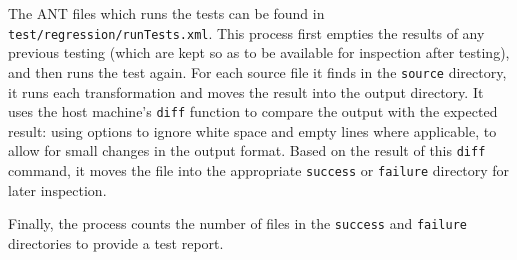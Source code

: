 The ANT files which runs the tests can be found in
\verb|test/regression/runTests.xml|.  This process first empties the
results of any previous testing (which are kept so as to be available for
inspection after testing), and then runs the test again.  For each
source file it finds in the \verb|source| directory, it runs each
transformation and moves the result into the output directory.  It
uses the host machine's \verb|diff| function to compare the output
with the expected result: using options to ignore white space and
empty lines where applicable, to allow for small changes in the output
format.  Based on the result of this \verb|diff| command, it moves the
file into the appropriate \verb|success| or \verb|failure| directory
for later inspection.  

Finally, the process counts the number of files in the \verb|success|
and \verb|failure| directories to provide a test report.


